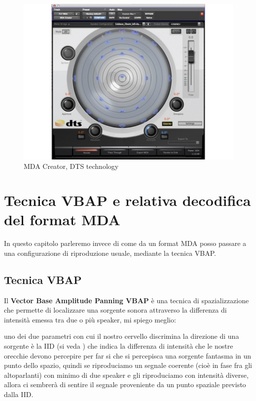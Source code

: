 \documentclass[12pt,a4paper]{report}
\begin{document}
\begin{figure}[htbp]
	\centering
	\includegraphics[scale=0.50]{figures/mdacreator.jpg}

	\caption {MDA Creator, DTS technology}
	\label{fig:mdacreator}
	\end{figure}

\chapter{Tecnica VBAP e relativa decodifica del format MDA}

In questo capitolo parleremo invece di come da un format MDA posso passare a una configurazione di riproduzione usuale, mediante la tecnica VBAP.\\

\section{Tecnica VBAP}

Il \textbf{Vector Base Amplitude Panning VBAP} è una tecnica di spazializzazione che permette di localizzare una sorgente sonora attraverso la differenza di intensità emessa tra due o più speaker, mi spiego meglio:

uno dei due parametri con cui il nostro cervello discrimina la direzione di una sorgente è la IID (si veda \cite{iid}) che indica la differenza di intensità che le nostre orecchie devono percepire per far si che si percepisca una sorgente fantasma in un punto dello spazio, quindi se riproduciamo un segnale coerente (cioè in fase fra gli altoparlanti) con minimo di due speaker e gli riproduciamo con intensità diverse, allora ci sembrerà di sentire il segnale proveniente da un punto spaziale previsto dalla IID.\\
\end{document}
